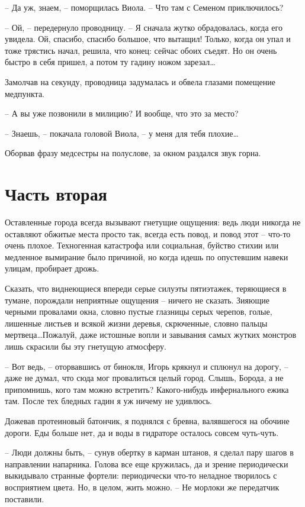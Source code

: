 \documentclass[a4paper]{book}
\begin{document}
-- Да уж, знаем, -- поморщилась Виола. -- Что там с Семеном приключилось?

-- Ой, -- передернуло проводницу. -- Я сначала жутко обрадовалась, когда его увидела. Ой, спасибо, спасибо большое, что вытащил! Только, когда он упал и тоже трястись начал, решила, что конец: сейчас обоих съедят. Но он очень быстро в себя пришел, а потом ту гадину ножом зарезал\ldots 

Замолчав на секунду, проводница задумалась и обвела глазами помещение медпункта. 

-- А вы уже позвонили в милицию? И вообще, что это за место?

-- Знаешь, -- покачала головой Виола, -- у меня для тебя плохие\ldots 

Оборвав фразу медсестры на полуслове, за окном раздался звук горна. 

\section{Часть вторая}

Оставленные города всегда вызывают гнетущие ощущения: ведь люди никогда не оставляют обжитые места просто так, всегда есть повод, и повод этот -- что-то очень плохое. Техногенная катастрофа или социальная, буйство стихии или медленное вымирание было причиной, но когда идешь по опустевшим навеки улицам, пробирает дрожь. 

Сказать, что виднеющиеся впереди серые силуэты пятиэтажек, теряющиеся в тумане, порождали неприятные ощущения -- ничего не сказать. Зияющие черными провалами окна, словно пустые глазницы серых черепов, голые, лишенные листьев и всякой жизни деревья, скрюченные, словно пальцы мертвеца\ldots  Пожалуй, даже истошные вопли и завывания самых жутких монстров лишь скрасили бы эту гнетущую атмосферу.

-- Вот ведь, -- оторвавшись от бинокля, Игорь крякнул и сплюнул на дорогу, -- даже не думал, что сюда мог провалиться целый город. Слышь, Борода, а не припомнишь, кого там можно встретить? Какого-нибудь инфернального ежика там. После тех бледных гадин я уж ничему не удивлюсь.

Дожевав протеиновый батончик, я поднялся с бревна, валявшегося на обочине дороги. Еды больше нет, да и воды в гидраторе осталось совсем чуть-чуть. 

-- Люди должны быть, -- сунув обертку в карман штанов, я сделал пару шагов в направлении напарника. Голова все еще кружилась, да и зрение периодически выкидывало странные фортели: периодически что-то неладное творилось с восприятием цвета. Но, в целом, жить можно. -- Не морлоки же передатчик поставили. 
\end{document}

